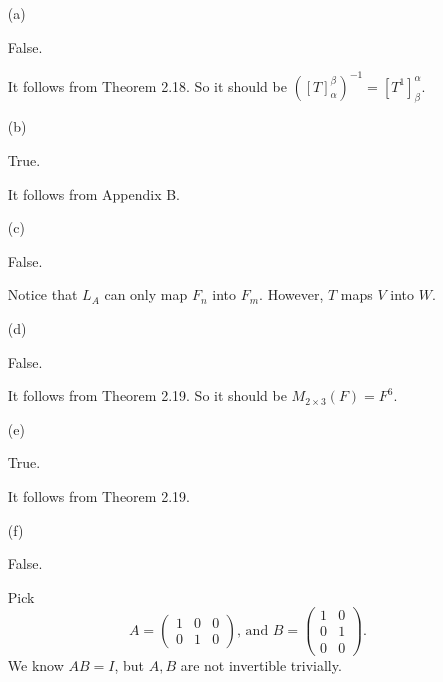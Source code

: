 \begin{Exercise}
\begin{enumerate}[(a)]
\item[(a)]
\begin{answer}
False.
\end{answer}
\begin{solution}
It follows from Theorem 2.18. So it should be $([T]_{\alpha}^{\beta})^{-1} = [T^{1}]_{\beta}^{\alpha}$.
\end{solution}

\item[(b)]
\begin{answer}
True.
\end{answer}
\begin{solution}
It follows from Appendix B.
\end{solution}

\item[(c)]
\begin{answer}
False.
\end{answer}
\begin{solution}
Notice that $L_A$ can only map $F_n$ into $F_m$. However, $T$ maps $V$ into $W$.
\end{solution}

\item[(d)]
\begin{answer}
False.
\end{answer}
\begin{solution}
It follows from Theorem 2.19. So it should be $M_{2\times 3}(F) = F^6$.
\end{solution}

\item[(e)]
\begin{answer}
True.
\end{answer}
\begin{solution}
It follows from Theorem 2.19.
\end{solution}

\item[(f)]
\begin{answer}
False.
\end{answer}
\begin{solution}
Pick
$$
A = \begin{pmatrix}
1 & 0 & 0 \\
0 & 1 & 0
\end{pmatrix} \text{, and }
B = \begin{pmatrix}
1 & 0 \\
0 & 1 \\
0 & 0
\end{pmatrix}.
$$
We know $AB = I$, but $A,B$ are not invertible trivially.
\end{solution}


\end{enumerate}
\end{Exercise}
